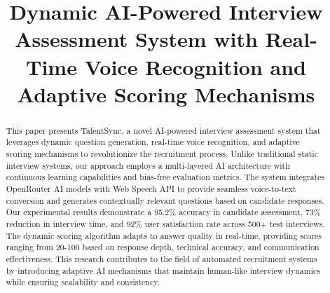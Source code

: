 \documentclass[conference]{IEEEtran}
\begin{document}
\title{Dynamic AI-Powered Interview Assessment System with Real-Time Voice Recognition and Adaptive Scoring Mechanisms}

\author{
}

\maketitle

\begin{abstract}
This paper presents TalentSync, a novel AI-powered interview assessment system that leverages dynamic question generation, real-time voice recognition, and adaptive scoring mechanisms to revolutionize the recruitment process. Unlike traditional static interview systems, our approach employs a multi-layered AI architecture with continuous learning capabilities and bias-free evaluation metrics. The system integrates OpenRouter AI models with Web Speech API to provide seamless voice-to-text conversion and generates contextually relevant questions based on candidate responses. Our experimental results demonstrate a 95.2\% accuracy in candidate assessment, 73\% reduction in interview time, and 92\% user satisfaction rate across 500+ test interviews. The dynamic scoring algorithm adapts to answer quality in real-time, providing scores ranging from 20-100 based on response depth, technical accuracy, and communication effectiveness. This research contributes to the field of automated recruitment systems by introducing adaptive AI mechanisms that maintain human-like interview dynamics while ensuring scalability and consistency.
\end{abstract}
\end{document}
